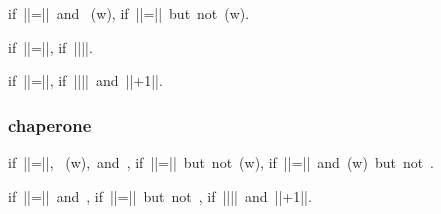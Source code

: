 \begin{figure*}


       {}{\mbox{if }|\vv|=|\vvp|\mbox{ and } (w)\mbox{,}}
       {\serr{\ks}{\sigma}{\impblame{\ell}}}{\mbox{if }|\vv|=|\vvp|\mbox{ but not }(w)\mbox{.}}

       {}{\mbox{if }|\vv|=|\vvp|\mbox{,}}
       {\serr{\ks}{\sigma}{\impblame{\ell}}}{\mbox{if }|\vv|\ne|\vvp|\mbox{.}}




\redtwo{\sval{\impcrk{\vv}::\ks}{\sigma}{\vvp}}
       {\sval{\ks}{\sigma}{\vvp}}{\mbox{if }|\vv|=|\vvp|\mbox{,}}
       {\serr{\ks}{\sigma}{\impblame{\ell}}}{\mbox{if }|\vv|\ne|\vvp|\mbox{ and }|\vv|+1\ne|\vvp|\mbox{.}}


\subsubsection{chaperone}



       {}{\mbox{if }|\vv|=|\vvp|\mbox{, } (w)\mbox{, and }\chapof{\vvp}{\vv}\mbox{,}}
       {\serr{\ks}{\sigma}{\impblame{\ell}}}{\mbox{if }|\vv|=|\vvp|\mbox{ but not }(w)\mbox{,}}
       {\serr{\ks}{\sigma}{\chablame{\ell}}}{\mbox{if }|\vv|=|\vvp|\mbox{ and }(w)\mbox{ but not }\chapof{\vvp}{\vv}\mbox{.}}


       {}{\mbox{if }|\vv|=|\vvp|\mbox{ and }\chapof{\vvp}{\vv}\mbox{,}}
       {\serr{\ks}{\sigma}{\chablame{\ell}}}{\mbox{if }|\vv|=|\vvp|\mbox{ but not }\chapof{\vvp}{\vv}\mbox{,}}
       {\serr{\ks}{\sigma}{\impblame{\ell}}}{\mbox{if }|\vv|\ne|\vvp|\mbox{ and }|\vv|+1\ne|\vvp|\mbox{.}}




\end{figure*}
